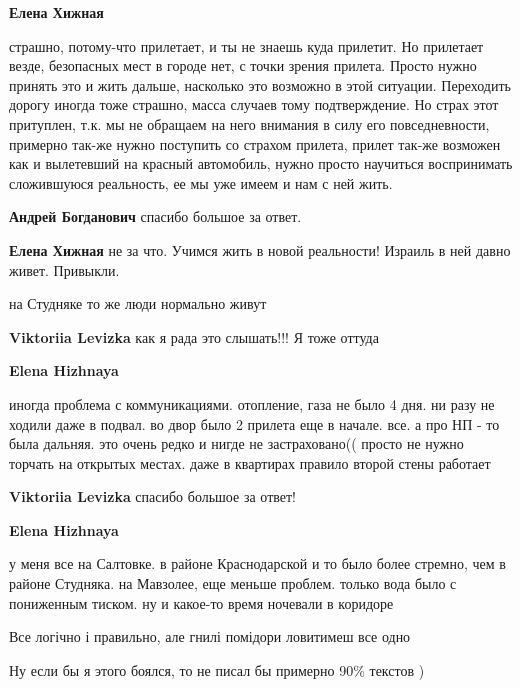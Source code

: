 \begin{itemize}
\begin{itemize}
\textbf{Елена Хижная} 

страшно, потому-что прилетает, и ты не знаешь куда прилетит. Но прилетает везде, безопасных мест в городе нет, с точки зрения прилета. Просто нужно принять это и жить дальше, насколько это возможно в этой ситуации. Переходить дорогу иногда тоже страшно, масса случаев тому подтверждение. Но страх этот притуплен, т.к. мы не обращаем на него внимания в силу его повседневности, примерно так-же нужно поступить со страхом прилета, прилет так-же возможен как и вылетевший на красный автомобиль, нужно просто научиться воспринимать сложившуюся реальность, ее мы уже имеем и нам с ней жить.

\textbf{Андрей Богданович} спасибо большое за ответ.

\textbf{Елена Хижная} не за что. Учимся жить в новой реальности! Израиль в ней давно живет. Привыкли.

\end{itemize} %

на Студняке то же люди нормально живут

\begin{itemize} %
\textbf{Viktoriia Levizka} как я рада это слышать!!! Я тоже оттуда

\textbf{Elena Hizhnaya} 

иногда проблема с коммуникациями. отопление, газа не было 4 дня. ни разу не
ходили даже в подвал. во двор было 2 прилета еще в начале. все. а про НП - то
была дальняя. это очень редко и нигде не застраховано(( просто не нужно торчать
на открытых местах. даже в квартирах правило второй стены работает

\textbf{Viktoriia Levizka} спасибо большое за ответ!

\textbf{Elena Hizhnaya} 

у меня все на Салтовке. в районе Краснодарской и то было более стремно, чем в
районе Студняка. на Мавзолее, еще меньше проблем. только вода было с пониженным
тиском. ну и какое-то время ночевали в коридоре

\end{itemize} %


Все логічно і правильно, але гнилі помідори ловитимеш все одно

Ну если бы я этого боялся, то не писал бы примерно 90\% текстов )


\end{itemize}
